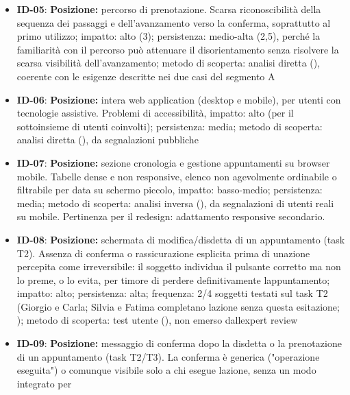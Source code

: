 \begin{itemize}
  scoperta: analisi diretta e inversa (), illustrato nel caso di Giorgio
  attraverso il dubbio SSN/Libera Professione
\item
  \hypertarget{req:ID-05}{}\textbf{ID-05}: \textbf{Posizione:} percorso di prenotazione.
  Scarsa riconoscibilità della sequenza dei passaggi e dell’avanzamento
  verso la conferma, soprattutto al primo utilizzo;
  impatto: alto (3); persistenza: medio-alta (2,5), perché la familiarità
  con il percorso può attenuare il disorientamento senza risolvere la
  scarsa visibilità dell’avanzamento; metodo di scoperta: analisi diretta
  (), coerente con le esigenze descritte nei due casi del segmento A
\item
  \hypertarget{req:ID-06}{}\textbf{ID-06}: \textbf{Posizione:} intera web application (desktop e mobile), per utenti con
  tecnologie assistive. Problemi di accessibilità, impatto: alto (per
  il sottoinsieme di utenti coinvolti); persistenza: media; metodo di
  scoperta: analisi diretta (), da segnalazioni pubbliche
\item
  \hypertarget{req:ID-07}{}\textbf{ID-07}: \textbf{Posizione:} sezione cronologia e gestione appuntamenti
  su browser mobile. Tabelle dense e non responsive, elenco non agevolmente
  ordinabile o filtrabile per data su schermo piccolo, impatto: basso-medio;
  persistenza: media; metodo di scoperta: analisi inversa (), da
  segnalazioni di utenti reali su mobile. Pertinenza per il redesign:
  adattamento responsive secondario.
\item
  \hypertarget{req:ID-08}{}\textbf{ID-08}: \textbf{Posizione:} schermata di modifica/disdetta di un
  appuntamento (task T2). Assenza di conferma o rassicurazione
  esplicita prima di un\textquotesingle azione percepita come
  irreversibile: il soggetto individua il pulsante corretto ma non lo
  preme, o lo evita, per timore di perdere definitivamente
  l\textquotesingle appuntamento; impatto: alto; persistenza: alta;
  frequenza: 2/4 soggetti testati sul task T2 (Giorgio e Carla;
  Silvia e Fatima completano l\textquotesingle azione senza questa
  esitazione; ); metodo di scoperta: test utente (),
  non emerso dall\textquotesingle expert review
\item
  \hypertarget{req:ID-09}{}\textbf{ID-09}: \textbf{Posizione:} messaggio di conferma dopo la
  disdetta o la prenotazione di un appuntamento (task T2/T3). La
  conferma è generica ("operazione eseguita") o comunque visibile solo
  a chi esegue l\textquotesingle azione, senza un modo integrato per

\end{itemize}

